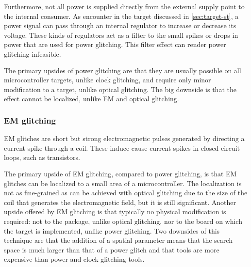 \documentclass[10pt]{article}
\begin{document}
      Furthermore, not all power is supplied directly from the external supply point to the internal consumer. As encounter in the target discussed in \autoref{sec:target-st}, a power signal can pass through an internal regulator to increase or decrease its voltage. These kinds of regulators act as a filter to the small spikes or drops in power that are used for power glitching. This filter effect can render power glitching infeasible.

      The primary upsides of power glitching are that they are usually possible on all microcontroller targets, unlike clock glitching, and require only minor modification to a target, unlike optical glitching. The big downside is that the effect cannot be localized, unlike EM and optical glitching.

    \subsubsection{EM glitching }

      EM glitches are short but strong electromagnetic pulses generated by directing a 
      current spike through a coil. These induce cause current spikes 
      in closed circuit loops, such as transistors. \cite{aarts_electromagnetic_2013}

      The primary upside of EM glitching, compared to power glitching, is that EM glitches can be localized to a small area of a microcontroller. The localization is not as fine-grained as can be achieved with optical glitching due to the size of the coil that generates the electromagnetic field, but it is still significant. Another upside offered by EM glitching is that typically no physical modification is required: not to the package, unlike optical glitching, nor to the board on which the target is implemented, unlike power glitching. Two downsides of this technique are that the addition of a spatial parameter means that the search space is much larger than that of a power glitch and that tools are more expensive than power and clock glitching tools.
\end{document}
